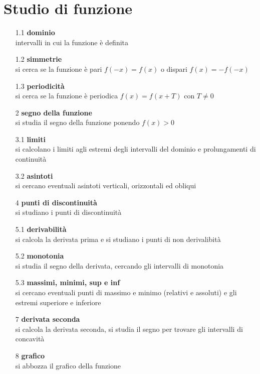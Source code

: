 \documentclass[a4paper]{article}
\begin{document}
\section{Studio di funzione}
\begin{itemize}
	\item[1.1] \textbf{dominio} \\
	intervalli in cui la funzione è definita
	\item[1.2] \textbf{simmetrie} \\
	si cerca se la funzione è pari \(f(-x) = f(x)\) o dispari \(f(x) = -f(-x)\)
	\item[1.3] \textbf{periodicità} \\
	si cerca se la funzione è periodica \(f(x) = f(x + T)\) con \(T \neq 0\)
	\item[2] \textbf{segno della funzione} \\
	si studia il segno della funzione ponendo \(f(x) > 0\)
	\item[3.1] \textbf{limiti} \\
	si calcolano i limiti agli estremi degli intervalli del dominio e prolungamenti di continuità
	\item[3.2] \textbf{asintoti} \\
	si cercano eventuali asintoti verticali, orizzontali ed obliqui
	\item[4] \textbf{punti di discontinuità} \\
	si studiano i punti di discontinuità
	\item[5.1] \textbf{derivabilità} \\
	si calcola la derivata prima e si studiano i punti di non derivalibità
	\item[5.2] \textbf{monotonia} \\
	si studia il segno della derivata, cercando gli intervalli di monotonia
	\item[5.3] \textbf{massimi, minimi, sup e inf} \\
	si cercano eventuali punti di massimo e minimo (relativi e assoluti) e gli estremi superiore e inferiore
	\item[7] \textbf{derivata seconda} \\
	si calcola la derivata seconda, si studia il segno per trovare gli intervalli di concavità
	\item[8] \textbf{grafico} \\
	si abbozza il grafico della funzione
\end{itemize}

\newpage
\end{document}
